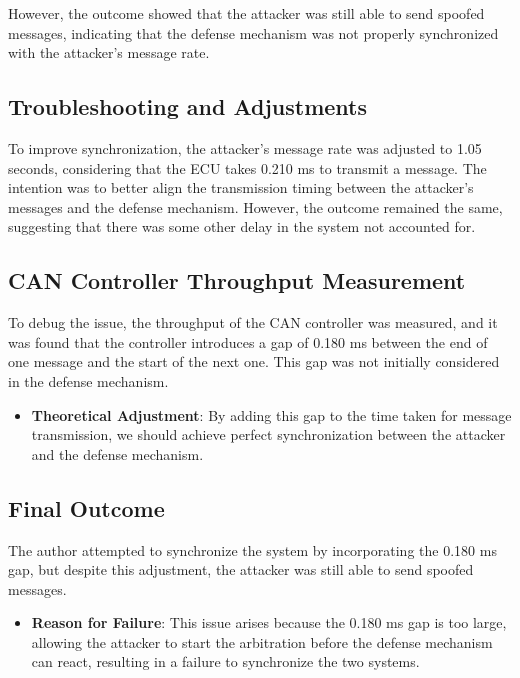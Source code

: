 \documentclass[10pt,twocolumn,letterpaper]{article}
\begin{document}
However, the outcome showed that the attacker was still able to send spoofed messages, indicating that the defense mechanism was not properly synchronized with the attacker’s message rate.

\subsection{Troubleshooting and Adjustments}

To improve synchronization, the attacker’s message rate was adjusted to 1.05 seconds, considering that the ECU takes 0.210 ms to transmit a message. The intention was to better align the transmission timing between the attacker’s messages and the defense mechanism. However, the outcome remained the same, suggesting that there was some other delay in the system not accounted for.

\subsection{CAN Controller Throughput Measurement}

To debug the issue, the throughput of the CAN controller was measured, and it was found that the controller introduces a gap of 0.180 ms between the end of one message and the start of the next one. This gap was not initially considered in the defense mechanism. 

\begin{itemize}
    \item \textbf{Theoretical Adjustment}: By adding this gap to the time taken for message transmission, we should achieve perfect synchronization between the attacker and the defense mechanism.
\end{itemize}

\subsection{Final Outcome}

The author attempted to synchronize the system by incorporating the 0.180 ms gap, but despite this adjustment, the attacker was still able to send spoofed messages.

\begin{itemize}
    \item \textbf{Reason for Failure}: This issue arises because the 0.180 ms gap is too large, allowing the attacker to start the arbitration before the defense mechanism can react, resulting in a failure to synchronize the two systems.
\end{itemize}
\end{document}
